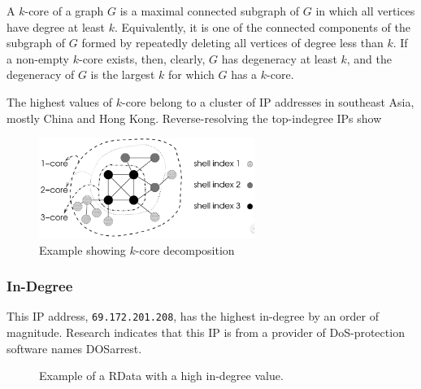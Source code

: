 \documentclass{acm_proc_article-sp}
\begin{document}
A $k$-core of a graph $G$ is a maximal connected subgraph of $G$ in which all vertices have degree at least $k$. Equivalently, it is one of the connected components of the subgraph of $G$ formed by repeatedly deleting all vertices of degree less than $k$. If a non-empty $k$-core exists, then, clearly, $G$ has degeneracy at least $k$, and the degeneracy of $G$ is the largest $k$ for which $G$ has a $k$-core.

The highest values of $k$-core belong to a cluster of IP addresses in southeast Asia, mostly China and Hong Kong. Reverse-resolving the top-indegree IPs show 

\begin{figure}[ht!]
\centering
\includegraphics[width=70mm]{images/kcore.png}
\caption{Example showing $k$-core decomposition~\cite{alvarez2005k} \label{overflow}}
\end{figure}


\subsubsection{In-Degree}
This IP address, \texttt{69.172.201.208}, has the highest in-degree by an order of magnitude. Research indicates that this IP is from a provider of DoS-protection software names DOSarrest. \begin{figure}
\centering
    \usetikzlibrary{arrows.meta}
\caption{
Example of a RData with a high in-degree value.}
\label{fig:my_label}
\end{figure}
\end{document}
